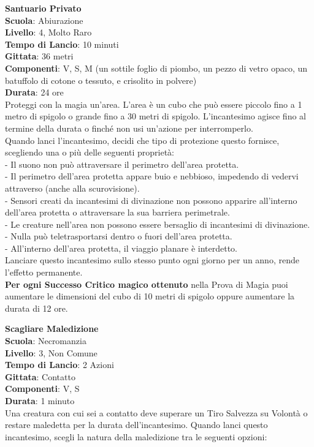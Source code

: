 \begin{multicols}{2}
\medskip\textbf{Santuario Privato}\\
\textbf{Scuola}: Abiurazione\\
\textbf{Livello}: 4, Molto Raro\\
\textbf{Tempo di Lancio}: 10 minuti\\
\textbf{Gittata}: 36 metri\\
\textbf{Componenti}: V, S, M (un sottile foglio di piombo, un pezzo di vetro opaco, un batuffolo di cotone o tessuto, e crisolito in polvere)\\
\textbf{Durata}: 24 ore \\
Proteggi con la magia un'area. L'area è un cubo che può essere piccolo fino a 1 metro di spigolo o grande fino a 30 metri di spigolo. L'incantesimo agisce fino al termine della durata o finché non usi un'azione per interromperlo.\\
Quando lanci l'incantesimo, decidi che tipo di protezione questo fornisce, scegliendo una o più delle seguenti proprietà:\\

- Il suono non può attraversare il perimetro dell'area protetta.\\
- Il perimetro dell'area protetta appare buio e nebbioso, impedendo di vedervi attraverso (anche alla scurovisione).\\
- Sensori creati da incantesimi di divinazione non possono apparire all'interno dell'area protetta o attraversare la sua barriera perimetrale.\\
- Le creature nell'area non possono essere bersaglio di incantesimi di divinazione.\\
- Nulla può teletrasportarsi dentro o fuori dell'area protetta.\\
- All'interno dell'area protetta, il viaggio planare è interdetto.\\

Lanciare questo incantesimo sullo stesso punto ogni giorno per un anno, rende l'effetto permanente.\\
\textbf{Per ogni Successo Critico magico ottenuto} nella Prova di Magia puoi aumentare le dimensioni del cubo di 10 metri di spigolo oppure aumentare la durata di 12 ore.

\medskip\textbf{Scagliare Maledizione}\\
\textbf{Scuola}: Necromanzia\\
\textbf{Livello}: 3, Non Comune\\
\textbf{Tempo di Lancio}: 2 Azioni\\
\textbf{Gittata}: Contatto\\
\textbf{Componenti}: V, S\\
\textbf{Durata}: 1 minuto\\
Una creatura con cui sei a contatto deve superare un Tiro Salvezza su Volontà o restare maledetta per la durata dell'incantesimo. Quando lanci questo incantesimo, scegli la natura della maledizione tra le seguenti opzioni:\\


\end{multicols}
